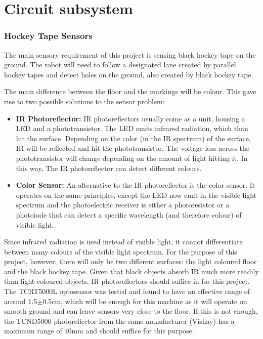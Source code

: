 \documentclass[11pt]{report}
\begin{document}
\section{Circuit subsystem}





\subsubsection{Hockey Tape Sensors}

The main sensory requirement of this project is sensing black hockey tape on the ground. The robot will need to follow a designated lane created by parallel hockey tapes and detect holes on the ground, also created by black hockey tape.

The main difference between the floor and the markings will be colour. This gave rise to two possible solutions to the sensor problem:
\begin{itemize}

\item{\textbf{IR Photoreflector:}
IR photoreflectors usually come as a unit, housing a LED and a phototransistor. The LED emits infrared radiation, which than hit the surface. Depending on the color (in the IR spectrum) of the surface, IR will be reflected and hit the phototransistor. The voltage loss across the phototransistor will change depending on the amount of light hitting it. In this way, The IR photoreflector can detect different colours. }

\item{\textbf{Color Sensor:}
An alternative to the IR photoreflector is the color sensor. It operates on the same principles, except the LED now emit in the visible light spectrum and the photoelectric receiver is either a photoresistor or a photoiode that can detect a specific wavelength (and therefore colour) of visible light.}
\end{itemize}

Since infrared radiation is used instead of visible light, it cannot differentiate between many colours of the visible light spectrum. For the purpose of this project, however, there will only be two different surfaces: the light coloured floor and the black hockey tape. Given that black objects absorb IR much more readily than light coloured objects, IR photoreflectors should suffice in for this project. The TCRT5000L optosensor was tested and found to have an effective range of around 1.5$\pm$0.5cm, which will be enough for this machine as it will operate on smooth ground and can leave sensors very close to the floor. If this is not enough, the TCND5000 photoreflector from the same manufacturer (Vishay) has a maximum range of 40mm and should suffice for this purpose.
\end{document}
